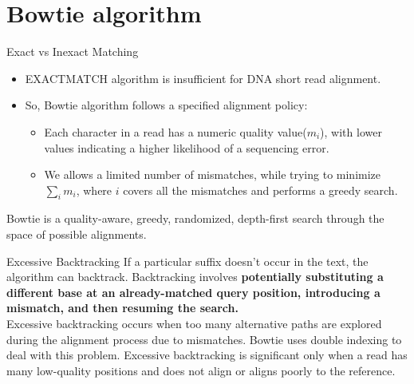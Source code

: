 \documentclass[mathserif]{beamer}
\begin{document}
\section{Bowtie algorithm}
\begin{frame}{Exact vs Inexact Matching}
    \begin{itemize}
        \item EXACTMATCH algorithm is insufficient for DNA short read alignment.
        \item So, Bowtie algorithm follows a specified alignment policy:
        \begin{itemize}
    
        \item Each character in a read has a numeric quality value($m_i$), with
        lower values indicating a higher likelihood of a sequencing
        error. 
        \item We allows a limited number of mismatches, while trying to minimize $\sum_i m_i$, 
        where $i$ covers all the mismatches and performs a greedy search.  
        \end{itemize}
    \end{itemize} 
    \vspace{5mm}
    Bowtie is a quality-aware, greedy, randomized, depth-first search through the
    space of possible alignments.
\end{frame}

\begin{frame}{Excessive Backtracking}
    If a particular suffix doesn't occur in the 
    text, the algorithm can backtrack. Backtracking involves \textbf{potentially substituting 
    a different base at an already-matched query position, introducing a mismatch, and 
    then resuming the search.}\\
\vspace{5mm}
    Excessive backtracking occurs when too many alternative paths are explored during the alignment 
    process due to mismatches. Bowtie uses double indexing to deal with this problem.
    Excessive backtracking is significant only when a read has many low-quality 
    positions and does not align or aligns poorly to the reference.
\end{frame}
\end{document}

